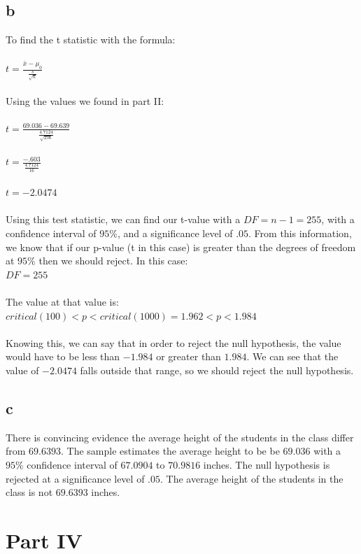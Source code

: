 \documentclass[10pt,letterpaper]{article}
\begin{document}
\subsection*{b}
To find the t statistic with the formula:\\\\
$t=\frac{\bar{x}-\mu_0}{\frac{s}{\sqrt{n}}}$\\\\
Using the values we found in part II:\\\\
$t=\frac{69.036-69.639}{\frac{4.7124}{\sqrt{256}}}$\\\\
$t=\frac{-.603}{\frac{4.7124}{16}}$\\\\
$t=-2.0474$\\\\
Using this test statistic, we can find our t-value with a $DF=n-1=255$, with a
confidence interval of $95\%$, and a significance level of $.05$. From this 
information, we know that if our p-value (t in this case) is greater than the
degrees of freedom at $95\%$ then we should reject. In this case:\\
$DF=255$\\\\
The value at that value is: $critical(100) < p < critical(1000) = 1.962 < p < 
1.984$\\\\
Knowing this, we can say that in order to reject the null hypothesis, the value
would have to be less than $-1.984$ or greater than $1.984$. We can see that
the value of $-2.0474$ falls outside that range, so we should reject the
null hypothesis.

\subsection*{c}
There is convincing evidence the average height of the students in the
class differ from $69.6393$. The sample estimates the average height to be be 
$69.036$ with a $95\%$ confidence interval of $67.0904$ to $70.9816$ inches. The
null hypothesis is rejected at a significance level of $.05$. The average
height of the students in the class is not $69.6393$ inches.


\section*{Part IV}
\end{document}
